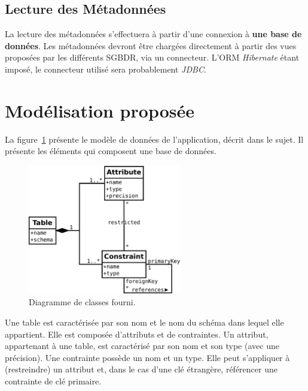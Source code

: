 	\subsection{Lecture des Métadonnées}
	La lecture des métadonnées s'effectuera à partir d'une connexion à \textbf{une base de données}. Les métadonnées devront être chargées directement à partir des vues proposées par les différents SGBDR, via un connecteur. L'ORM \emph{Hibernate} étant imposé, le connecteur utilisé sera probablement \emph{JDBC}.

\section{Modélisation proposée}
\label{section:modelisation_proposee}

La figure~\ref{figure:diag_classe_fournit} présente le modèle de données de l'application, décrit dans le sujet. Il présente les éléments qui composent une base de données.

\begin{figure}[H]
\centering
\includegraphics[width=0.6\textwidth]{files/diag_class_origine}
\caption{Diagramme de classes fourni.}
\label{figure:diag_classe_fournit}
\end{figure}

Une table est caractérisée par son nom et le nom du schéma dans lequel elle appartient. Elle est composée d'attributs et de contraintes. Un attribut, appartenant à une table, est caractérisé par son nom et son type (avec une précision). Une contrainte possède un nom et un type. Elle peut s'appliquer à (restreindre) un attribut et, dans le cas d'une clé étrangère, référencer une contrainte de clé primaire.
